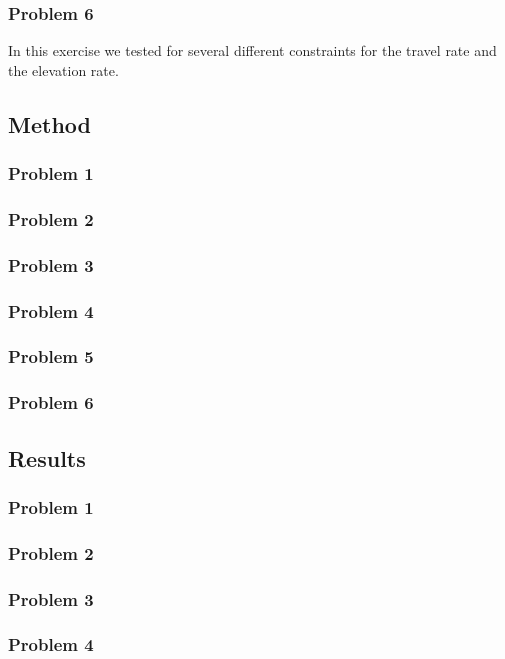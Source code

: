 \documentclass[12pt, a4paper]{article}%
\begin{document}
\subsubsection*{Problem 6}

In this exercise we tested for several different constraints for the travel rate and the elevation rate. 

\subsection*{Method}
\label{S:3}
\subsubsection*{Problem 1}
\subsubsection*{Problem 2}
\subsubsection*{Problem 3}
\subsubsection*{Problem 4}
\subsubsection*{Problem 5}
\subsubsection*{Problem 6}

\subsection*{Results}
\label{S:4}

\subsubsection*{Problem 1}
\subsubsection*{Problem 2}
\subsubsection*{Problem 3}
\subsubsection*{Problem 4}
\end{document}
